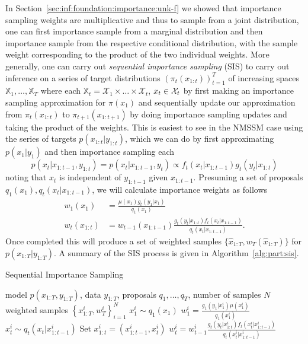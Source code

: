 In Section~\ref{sec:inf:foundation:importance:unk-f} we showed that importance sampling weights
are multiplicative and thus to sample from a joint
distribution, one can first importance sample from a marginal distribution and then importance
sample from the respective conditional distribution, with the sample weight corresponding to the
product of the two individual weights.  More generally, one can carry out \emph{sequential importance
	sampling} (SIS) to carry out inference on a series of target distributions $(\pi_t(x_{1:t}))_{t = 1}^T$ of 
increasing spaces $\mathbb{X}_1,\dots,\mathbb{X}_T$ where each
$\mathbb{X}_t = \mathcal{X}_1 \times \dots \times \mathcal{X}_t$, $x_t\in\mathcal{X}_t$ by first making
an importance sampling approximation for $\pi(x_1)$ and sequentially update our approximation from
$\pi_t(x_{1:t})$ to $\pi_{t+1}(x_{1:t+1})$ by doing importance sampling updates and taking the product of
the weights.  This is easiest to see in the NMSSM case using the series of targets $p(x_{1:t}|y_{1:t})$,
which we can do by first approximating $p(x_1 | y_1)$ and then importance sampling each 
\[
p (x_t | x_{1:t-1}, y_{1:t})=p(x_t | x_{1:t-1}, y_t)\propto f_{t}(x_t | x_{1:t-1}) g_{t}(y_t | x_{1:t})
\]
noting that $x_t$ is independent of $y_{1:t-1}$ given $x_{1:t-1}$.  
Presuming a set of proposals 
$q_1(x_1), q_t(x_t | x_{1:t-1})$, we will calculate importance weights as follows
\begin{subequations}
	\label{eq:part:sis-weights}
\begin{align}
w_1 (x_1) &= \frac{\mu (x_1)g_{t}(y_1 | x_1)}{q_1(x_1)} \\
w_t (x_{1:t}) &= w_{t-1} (x_{1:t-1}) \frac{g_{t}(y_t|x_{1:t}) f_{t}(x_t | x_{1:t-1})}{q_t(x_t|x_{1:t-1})}.
\end{align}
\end{subequations}
Once completed this will produce a set of weighted samples $\{\hat{x}_{1:T},w_T(\hat{x}_{1:T})\}$ for 
$p(x_{1:T} | y_{1:T})$.  A summary of the SIS process is given in Algorithm~\ref{alg:part:sis}.

\begin{algorithm}[tb]
	\caption{Sequential Importance Sampling}
	\label{alg:part:sis}
	\begin{spacing}{1.2}
		\begin{algorithmic}[1]
			\renewcommand{\algorithmicrequire}{\textbf{Inputs:}}
			\renewcommand{\algorithmicensure}{\textbf{Outputs:}}			 
			\Require model $p(x_{1:T},y_{1:T})$, data $y_{1:T}$, proposals $q_1,\dots,q_T$, number of samples $N$
			\Ensure weighted samples $\left\{x_{1:T}^i,w_T^i\right\}_{i=1}^N$
			\State $x_1^i \sim q_1(x_1)$
			\State $w_1^i = \frac{g_1(y_1|x_1^i) \mu(x_1^i)}{q_1(x_1^i)}$
			\State $x_t^i \sim q_t(x_t | x_{1:t-1}^i)$ 
			\State Set $x_{1:t}^i = (x_{1:t-1}^{i},x_t^i)$
			\State $w_t^i = w_{t-1}^i \frac{g_t(y_t|x_{1:t}^i) f_t(x_t^i | x_{1:t-1}^{i})}{q_t(x_t^i|x_{1:t-1}^{i})}$
			\EndFor
			\EndFor
		\end{algorithmic}
	\end{spacing}
\end{algorithm}

